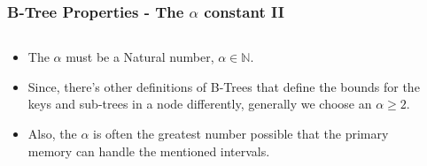 \documentclass{beamer}
\begin{document}
\begin{frame}
    \frametitle{B-Tree Properties - The \(\alpha\) constant II}
    \begin{columns}
        \begin{column}{\textlecolumn}
            \begin{block}{}
                \begin{itemize}
                    \item The \(\alpha\) must be a Natural number, \(\alpha \in \mathbb{N}\).
                    \item Since, there's other definitions of B-Trees that define the bounds for the keys and sub-trees in a node differently, generally we choose an \(\alpha \geq 2\).
                    \item Also, the \(\alpha\) is often the greatest number possible that the primary memory can handle the mentioned intervals.
                \end{itemize}
            \end{block}
        \end{column}
        \begin{column}{\textricolumn}
        \end{column}
    \end{columns}
\end{frame}
\end{document}
